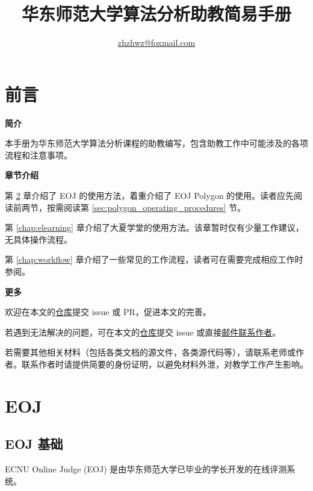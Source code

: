 \documentclass[oneside]{book}
\title{华东师范大学算法分析助教简易手册}
\author{\href{mailto:zhzhwz@foxmail.com}{zhzhwz@foxmail.com}}
\begin{document}
\frontmatter

\maketitle

\chapter{前言}

\noindent \textbf{简介}

本手册为华东师范大学算法分析课程的助教编写，包含助教工作中可能涉及的各项流程和注意事项。

\bigbreak

\noindent \textbf{章节介绍}

第 \ref{chap:eoj} 章介绍了 EOJ 的使用方法，着重介绍了 EOJ Polygon 的使用。读者应先阅读前两节，按需阅读第 \ref{sec:polygon_operating_procedures} 节。

第 \ref{chap:elearning} 章介绍了大夏学堂的使用方法。该章暂时仅有少量工作建议，无具体操作流程。

第 \ref{chap:workflow} 章介绍了一些常见的工作流程，读者可在需要完成相应工作时参阅。

\bigbreak

\noindent \textbf{更多}

欢迎在本文的\href{https://github.com/zhzhwz/AlgorithmTAManual}{仓库}提交 issue 或 PR，促进本文的完善。

若遇到无法解决的问题，可在本文的\href{https://github.com/zhzhwz/AlgorithmTAManual}{仓库}提交 issue 或直接\href{mailto:zhzhwz@foxmail.com}{邮件联系作者}。 

若需要其他相关材料（包括各类文档的源文件，各类源代码等），请联系老师或作者。联系作者时请提供简要的身份证明，以避免材料外泄，对教学工作产生影响。

\tableofcontents

\mainmatter

\chapter{EOJ}

\label{chap:eoj}

\section{EOJ 基础}

ECNU Online Judge (EOJ) 是由华东师范大学已毕业的学长开发的在线评测系统。
\end{document}
